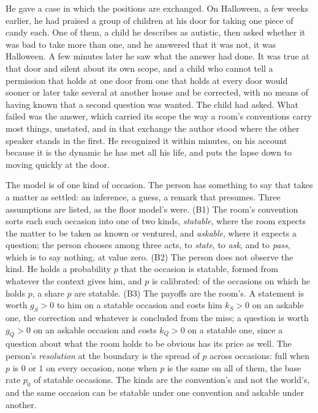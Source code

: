 He gave a case in which the positions are exchanged. On Halloween, a few weeks earlier, he had praised a group of children at his door for taking one piece of candy each. One of them, a child he describes as autistic, then asked whether it was bad to take more than one, and he answered that it was not, it was Halloween. A few minutes later he saw what the answer had done. It was true at that door and silent about its own scope, and a child who cannot tell a permission that holds at one door from one that holds at every door would sooner or later take several at another house and be corrected, with no means of having known that a second question was wanted. The child had asked. What failed was the answer, which carried its scope the way a room's conventions carry most things, unstated, and in that exchange the author stood where the other speaker stands in the first. He recognized it within minutes, on his account because it is the dynamic he has met all his life, and puts the lapse down to moving quickly at the door.

The model is of one kind of occasion. The person has something to say that takes a matter as settled: an inference, a guess, a remark that presumes. Three assumptions are listed, as the floor model's were. (B1) The room's convention sorts each such occasion into one of two kinds, \emph{statable}, where the room expects the matter to be taken as known or ventured, and \emph{askable}, where it expects a question; the person chooses among three acts, to \emph{state}, to \emph{ask}, and to \emph{pass}, which is to say nothing, at value zero. (B2) The person does not observe the kind. He holds a probability $p$ that the occasion is statable, formed from whatever the context gives him, and $p$ is calibrated: of the occasions on which he holds $p$, a share $p$ are statable. (B3) The payoffs are the room's. A statement is worth $g_S > 0$ to him on a statable occasion and costs him $k_S > 0$ on an askable one, the correction and whatever is concluded from the miss; a question is worth $g_Q > 0$ on an askable occasion and costs $k_Q > 0$ on a statable one, since a question about what the room holds to be obvious has its price as well. The person's \emph{resolution} at the boundary is the spread of $p$ across occasions: full when $p$ is $0$ or $1$ on every occasion, none when $p$ is the same on all of them, the base rate $p_0$ of statable occasions. The kinds are the convention's and not the world's, and the same occasion can be statable under one convention and askable under another.

